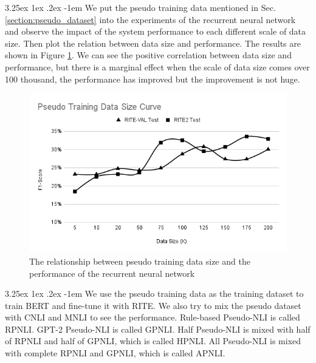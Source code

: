 \documentclass[12pt]{article}
\makeatletter
\renewcommand\paragraph{\@startsection{paragraph}{5}{\z@}%
  {3.25ex \@plus1ex \@minus.2ex}%
  {-1em}%
  {\normalfont\normalsize\bfseries}}
\makeatother
\begin{document}
\begin{CJK*}{UTF8}{bkai}
\begin{spacing}{1.77}
\paragraph{}
We put the pseudo training data mentioned in Sec. \ref{section:pseudo_dataset} into the experiments of the recurrent neural network and observe the impact of the system performance to each different scale of data size. Then plot the relation between data size and performance. The results are shown in Figure \ref{fig:pseudo_datasize}. We can see the positive correlation between data size and performance, but there is a marginal effect when the scale of data size comes over 100 thousand, the performance has improved but the improvement is not huge.

\begin{figure}[H]
  \centering
  \includegraphics[width=15cm]{PseudoTrainingDataSizeCurve.png}
  \caption[Pseudo Training Data Size Curve]{The relationship between pseudo training data size and the performance of the recurrent neural network}
  \label{fig:pseudo_datasize}
\end{figure}

\paragraph{}
We use the pseudo training data as the training dataset to train BERT and fine-tune it with RITE. We also try to mix the pseudo dataset with CNLI and MNLI to see the performance. Rule-based Pseudo-NLI is called RPNLI. GPT-2 Pseudo-NLI is called GPNLI. Half Pseudo-NLI is mixed with half of RPNLI and half of GPNLI, which is called HPNLI. All Pseudo-NLI is mixed with complete RPNLI and GPNLI, which is called APNLI.


\end{spacing}
\end{CJK*}
\end{document}
